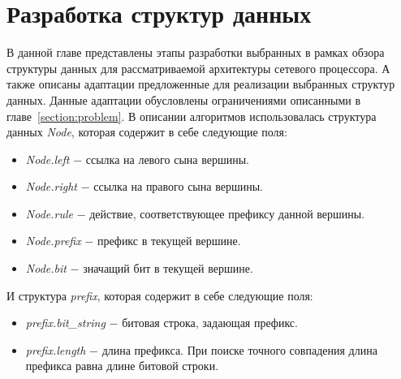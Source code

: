\documentclass[a4paper, 12pt, titlepage, finall]{extreport}
\begin{document}
   \chapter{Разработка структур данных}
        \label{section:trees}
        В данной главе представлены этапы разработки выбранных в рамках обзора структуры данных для рассматриваемой архитектуры сетевого процессора.
        А также описаны адаптации предложенные для реализации выбранных структур данных. Данные адаптации обусловлены ограничениями описанными в главе~\ref{section:problem}.
        В описании алгоритмов использовалась структура данных \emph{Node}, которая содержит в себе следующие поля:
        \begin{itemize}
            \item \emph{Node.left} $-$ ссылка на левого сына вершины.
            \item \emph{Node.right} $-$ ссылка на правого сына вершины.
            \item \emph{Node.rule} $-$ действие, соответствующее префиксу данной вершины.
            \item \emph{Node.prefix} $-$ префикс в текущей вершине.
            \item \emph{Node.bit} $-$ значащий бит в текущей вершине.
        \end{itemize}
        И структура \emph{prefix}, которая содержит в себе следующие поля:
        \begin{itemize}
            \item \emph{prefix.bit\_string} $-$ битовая строка, задающая префикс.
            \item \emph{prefix.length} $-$ длина префикса. При поиске точного совпадения длина префикса равна длине битовой строки.
        \end{itemize}
\end{document}
